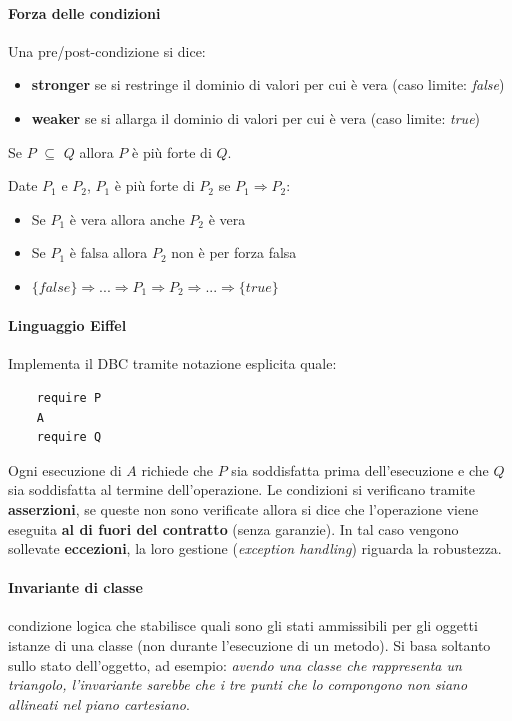 \paragraph{Forza delle condizioni} Una pre/post-condizione si dice:
\begin{itemize}
    \item \textbf{stronger} se si restringe il dominio di valori per cui è vera (caso limite: \textit{false})
    \item \textbf{weaker} se si allarga il dominio di valori per cui è vera (caso limite: \textit{true})
\end{itemize}

\begin{center}
Se $P$ $\subseteq$ $Q$ allora $P$ è più forte di $Q$.
\end{center}

Date \textit{$P_1$} e \textit{$P_2$}, $P_1$ è più forte di $P_2$ se $P_1 \Rightarrow P_2$:
\begin{itemize}
    \item Se $P_1$ è vera allora anche $P_2$ è vera
    \item Se $P_1$ è falsa allora $P_2$ non è per forza falsa
    \item $\{false\} \Rightarrow ... \Rightarrow P_1 \Rightarrow P_2 \Rightarrow ... \Rightarrow \{true\}$
\end{itemize}

\paragraph{Linguaggio Eiffel} Implementa il DBC tramite notazione esplicita quale:
\begin{verbatim}
    require P
    A
    require Q
\end{verbatim}
Ogni esecuzione di $A$ richiede che $P$ sia soddisfatta prima dell'esecuzione e che $Q$ sia soddisfatta al termine dell'operazione. Le condizioni si verificano tramite \textbf{asserzioni}, se queste non sono verificate allora si dice che l'operazione viene eseguita \textbf{al di fuori del contratto} (senza garanzie). In tal caso vengono sollevate \textbf{eccezioni}, la loro gestione (\textit{exception handling}) riguarda la robustezza.

\paragraph{Invariante di classe} condizione logica che stabilisce quali sono gli stati ammissibili per gli oggetti istanze di una classe (non durante l'esecuzione di un metodo). Si basa soltanto sullo stato dell'oggetto, ad esempio: \textit{avendo una classe che rappresenta un triangolo, l'invariante sarebbe che i tre punti che lo compongono non siano allineati nel piano cartesiano}.

